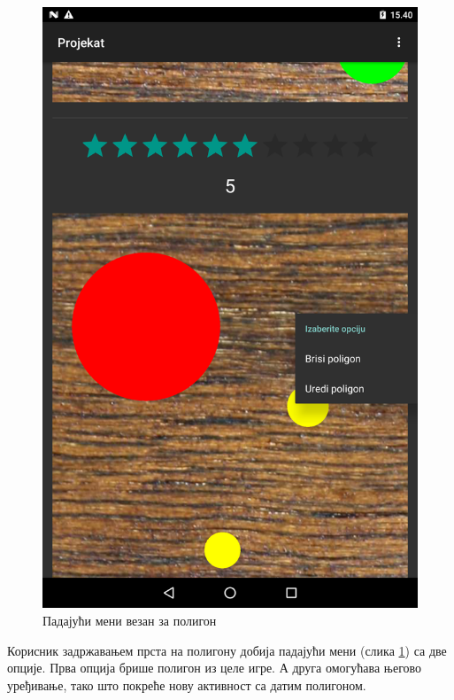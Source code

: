 \begin{figure}[htb!]
\begin{center}
\includegraphics[scale=.1]{pictures/main/PolygonMenu}
\caption{Падајући мени везан за полигон}\label{fig:mainPolygonMenu}
\end{center}
\end{figure}
Корисник задржавањем прста на полигону добија падајући мени (слика \ref{fig:mainPolygonMenu}) са две опције. Прва опција брише полигон из целе игре. А друга омогућава његово уређивање, тако што покреће нову активност са датим полигоном.

